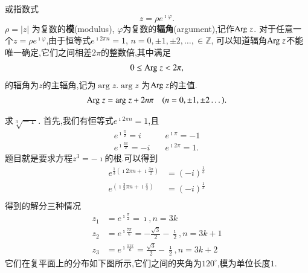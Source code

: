 或指数式
\begin{equation}
    z = \rho e^{\imath \varphi} .
\end{equation}
$\rho = |z|$ 为复数的{\bf 模}(modulus), $\varphi$为复数的{\bf 辐角}(argument),记作${\mathrm{Arg}\;} z$.
对于任意一个$z=\rho e^{\imath \varphi}$,由于恒等式$e^{\imath 2\pi n} = 1$, $n = 0, \pm 1, \pm 2, \dots, \in \mathbb{Z}$,
可以知道辐角${\mathrm{Arg}\;} z$不能唯一确定,它们之间相差$2\pi$的整数倍,其中满足
\begin{align}
    0 \leq {\mathrm{Arg}\;} z < 2\pi ,
\end{align}
的辐角为$z$的主辐角,记为$\arg z$.$\arg z$ 为${\mathrm{Arg}\;} z$的主值.
\begin{align}
    {\mathrm{Arg}\;} z = {\mathrm{arg}\;} z + 2 n \pi \quad (n = 0, \pm 1, \pm 2\dots).
\end{align}


\begin{examplebox}{求$\sqrt[3]{-\imath}$.}
    首先,我们有恒等式$e^{\imath 2\pi n} = 1$,且
    \begin{align*}
        e^{\imath \frac{\pi}{2}}  = i & \quad  e^{\imath \pi}  =-1 \\
        e^{\imath \frac{3\pi}{2}} = -i & \quad e^{\imath 2\pi} = 1.
    \end{align*}
题目就是要求方程$z^3 =-\imath$的根.可以得到
    \begin{align*}
        e^{\frac{1}{3}(\imath 2\pi n + \imath \frac{3\pi}{2})} & = (-i)^{\frac{1}{3}} \\
        e^{(\imath \frac{2}{3}\pi n + \imath \frac{\pi}{2})}   & =  (-i)^{\frac{1}{3}} \\
    \end{align*}
得到的解分三种情况
    \begin{align*}
        z_1 &=e^{\imath \frac{\pi}{2}} = \imath , n = 3k \\
        z_2 &=e^{\imath \frac{7\pi}{6}} = -\frac{\sqrt{3}}{2} - \frac{\imath}{2} , n = 3k +1 \\
        z_3 &=e^{\imath \frac{11\pi}{6}} = \frac{\sqrt{3}}{2} - \frac{\imath}{2} , n = 3k +2 
    \end{align*}
它们在复平面上的分布如下图所示,它们之间的夹角为$120^\circ$,模为单位长度$1$.
        \centering 
        
\end{examplebox}

